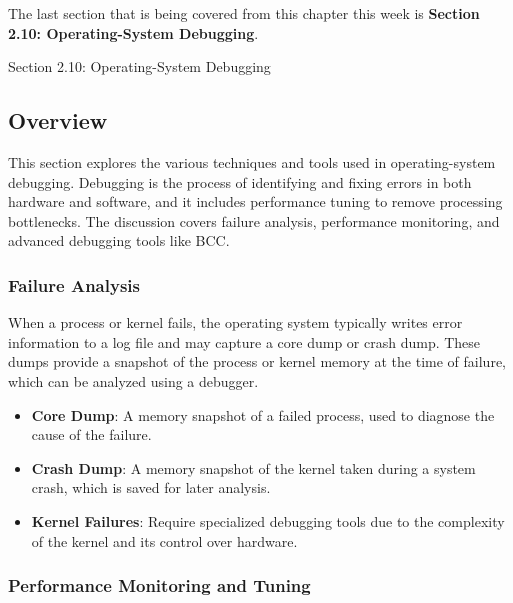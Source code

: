 The last section that is being covered from this chapter this week is \textbf{Section 2.10: Operating-System Debugging}.

\begin{notes}{Section 2.10: Operating-System Debugging}
    \subsection*{Overview}

    This section explores the various techniques and tools used in operating-system debugging. Debugging is the process of identifying and fixing errors in both hardware and software, and it includes 
    performance tuning to remove processing bottlenecks. The discussion covers failure analysis, performance monitoring, and advanced debugging tools like BCC.
    
    \subsubsection*{Failure Analysis}
    
    When a process or kernel fails, the operating system typically writes error information to a log file and may capture a core dump or crash dump. These dumps provide a snapshot of the process or 
    kernel memory at the time of failure, which can be analyzed using a debugger.
    
    \begin{highlight}
    
    \begin{itemize}
        \item \textbf{Core Dump}: A memory snapshot of a failed process, used to diagnose the cause of the failure.
        \item \textbf{Crash Dump}: A memory snapshot of the kernel taken during a system crash, which is saved for later analysis.
        \item \textbf{Kernel Failures}: Require specialized debugging tools due to the complexity of the kernel and its control over hardware.
    \end{itemize}
    
    \end{highlight}
    
    \subsubsection*{Performance Monitoring and Tuning}
    

\end{notes}
